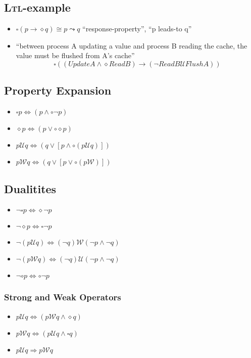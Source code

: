 \documentclass[a4paper, 10pt]{article}
\begin{document}
\subsection*{\textsc{Ltl}-example}
\begin{itemize}
    \item $\square(p\to\diamond q)\cong p\leadsto q$ ``response-property'', ``p leads-to q''
    \item ``between process A updating a value and process B reading the cache, the value must be flushed from A's cache''
    \[ \square((UpdateA\wedge\diamond ReadB)\to(\neg ReadB \mathcal{U}FlushA)) \]
\end{itemize}
\begin{multicols}{2}
\subsection*{Property Expansion}
\begin{itemize}
    \item $\square p \Leftrightarrow (p\wedge\circ\neg p)$
    \item $\diamond p\Leftrightarrow(p\vee\circ\diamond p)$
    \item $p \mathcal{U}q\Leftrightarrow(q\vee[p\wedge\circ(p \mathcal{U}q)])$
    \item $p \mathcal{W}q\Leftrightarrow(q\vee[p\vee\circ(p \mathcal{W})])$
\end{itemize}
\subsection*{Dualitites}
\begin{itemize}
    \item $\neg\square p \Leftrightarrow\diamond\neg p$
    \item $\neg\diamond p \Leftrightarrow\square\neg p$
    \item $\neg(p \mathcal{U}q)\Leftrightarrow(\neg q)\mathcal{W}(\neg p\wedge\neg q) $
    \item $\neg(p \mathcal{W} q)\Leftrightarrow(\neg q)\mathcal{U}(\neg p\wedge\neg q) $
    \item $\neg\circ p\Leftrightarrow \circ\neg p$
\end{itemize}
\subsubsection*{Strong and Weak Operators}
\begin{itemize}
    \item $p \mathcal{U}q\Leftrightarrow(p \mathcal{W} q \wedge\diamond q) $
    \item $p \mathcal{W}q\Leftrightarrow(p \mathcal{U} q \wedge\square q) $
    \item $p \mathcal{U}q\Rightarrow p \mathcal{W}q $
\end{itemize}

\end{multicols}
\end{document}

